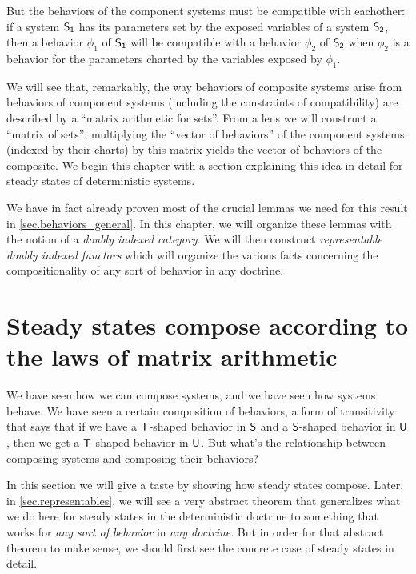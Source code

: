 \documentclass[DynamicalBook]{subfiles}
\begin{document}
But the behaviors of the component systems must be compatible with
eachother: if a system $\mathsf{S_1}$ has its parameters set by the exposed
variables of a system $\mathsf{S_2}$, then a behavior $\phi_1$ of $\mathsf{S_1}$ will be
compatible with a behavior $\phi_2$ of $\mathsf{S_2}$ when $\phi_2$ is a behavior
for the parameters charted by the variables exposed by $\phi_1$.

We will see that, remarkably, the way behaviors of composite systems arise from
behaviors of component systems (including the constraints of compatibility) are
described by a ``matrix arithmetic for sets''. From a lens we will construct a
``matrix of sets''; multiplying the ``vector of behaviors'' of the component
systems (indexed by their
charts) by this matrix yields the vector of behaviors of the composite. We begin this chapter with a
section explaining this idea in detail for steady states of deterministic
systems.

We have in fact already proven most of the crucial lemmas we need for this
result in \cref{sec.behaviors_general}. In this chapter, we will organize these
lemmas with the notion of a \emph{doubly indexed category}. We will then construct \emph{representable doubly indexed
  functors} which will organize the various facts concerning the
compositionality of any sort of behavior in any doctrine.



\section{Steady states compose according to the laws of matrix arithmetic}\label{sec.steady_states_matrix_arithmetic}


We have seen how we can compose systems, and we have seen how systems behave. We
have seen a certain composition of behaviors, a form of transitivity that says
that if we have a $\mathsf{T}$-shaped behavior in $\mathsf{S}$ and a $\mathsf{S}$-shaped
behavior in $\mathsf{U}$, then we get a $\mathsf{T}$-shaped behavior in $\mathsf{U}$. But what's the relationship between composing systems and composing their behaviors?

In this section we will give a
taste by showing how steady states compose. Later, in \cref{sec.representables}, we will see a very abstract
theorem that generalizes what we do here for steady states in the deterministic
doctrine to something that works for \emph{any sort of behavior} in \emph{any doctrine}.
But in order for that abstract theorem to make sense, we should first see the concrete
case of steady states in detail.  
\end{document}
